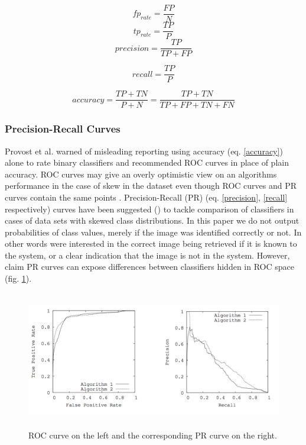 \documentclass[english,12pt,a4paper,pdftex,elec,utf8]{aaltothesis}
\begin{document}
\begin{equation}\label{FPR}
fp_{rate} = \frac{FP}{N}
\end{equation}
\begin{equation}\label{TPR}
tp_{rate} = \frac{TP}{P}
\end{equation}
\begin{equation}\label{precision}
precision = \frac{TP}{TP + FP}
\end{equation}

\begin{equation}\label{recall}
recall = \frac{TP}{P}
\end{equation}

\begin{equation}\label{accuracy}
accuracy = \frac{TP + TN}{P + N} = \frac{TP +TN}{TP + FP + TN + FN}
\end{equation}

\subsubsection{Precision-Recall Curves}\label{PRSection}
Provost et al. warned of misleading reporting using accuracy (eq. \ref{accuracy}) alone to rate binary classifiers \cite{Provost1997} and recommended ROC curves in place of plain accuracy. ROC curves may give an overly optimistic view on an algorithms performance in the case of skew in the dataset even though ROC curves and PR curves contain the same points \cite{Davis2006}. Precision-Recall (PR) (eq. \ref{precision}, \ref{recall} respectively) curves have been suggested (\cite{craven2005markov}) to tackle comparison of classifiers in cases of data sets with skewed class distributions. In this paper we do not output probabilities of class values, merely if the image was identified correctly or not. In other words were interested in the correct image being retrieved if it is known to the system, or a clear indication that the image is not in the system. However, \cite{Davis2006} claim PR curves can expose differences between classifiers hidden in ROC space (fig. \ref{rocpr}).

\begin{figure}[htb]
\begin{center}
\includegraphics[height=6cm]{figures/rocpr}
\end{center}
\caption{ROC curve on the left and the corresponding PR curve on the right. \cite{Davis2006}}
\label{rocpr}
\end{figure}
\end{document}
